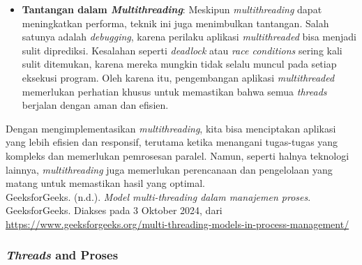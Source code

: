 \documentclass[12pt]{article}
\begin{document}
\begin{itemize}
    \item \textbf{Tantangan dalam \textit{Multithreading}}: Meskipun \textit{multithreading} dapat meningkatkan performa, teknik ini juga menimbulkan tantangan. Salah satunya adalah \textit{debugging}, karena perilaku aplikasi \textit{multithreaded} bisa menjadi sulit diprediksi. Kesalahan seperti \textit{deadlock} atau \textit{race conditions} sering kali sulit ditemukan, karena mereka mungkin tidak selalu muncul pada setiap eksekusi program. Oleh karena itu, pengembangan aplikasi \textit{multithreaded} memerlukan perhatian khusus untuk memastikan bahwa semua \textit{threads} berjalan dengan aman dan efisien.
\end{itemize}

Dengan mengimplementasikan \textit{multithreading}, kita bisa menciptakan aplikasi yang lebih efisien dan responsif, terutama ketika menangani tugas-tugas yang kompleks dan memerlukan pemrosesan paralel. Namun, seperti halnya teknologi lainnya, \textit{multithreading} juga memerlukan perencanaan dan pengelolaan yang matang untuk memastikan hasil yang optimal.\\

\noindent GeeksforGeeks. (n.d.). \textit{Model multi-threading dalam manajemen proses}. GeeksforGeeks. Diakses pada 3 Oktober 2024, dari \url{https://www.geeksforgeeks.org/multi-threading-models-in-process-management/}

\subsubsection{\textit{Threads} and Proses}
\end{document}
